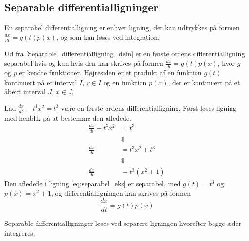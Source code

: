 \subsection{Separable differentialligninger}
En separabel differentialligning er enhver ligning, der kan udtrykkes på formen $\frac{dx}{dt}=g(t)p(x)$, og som kan løses ved integration.


Ud fra \autoref{Separable_differentialligning_defn} er en første ordens differentialligning separabel hvis og kun hvis den kan skrives på formen $\frac{dx}{dt}=g(t)p(x)$, hvor $g$ og $p$ er kendte funktioner. Højresiden er et produkt af en funktion $g(t)$ kontinuert på et interval $I$, $y\in I$ og en funktion $p(x)$, der er kontinuert på et åbent interval $J$, $x\in J$.

\begin{eks} \textbf{} %
\newline
Lad $\frac{dx}{dt}-t^3x^2=t^3$ være en første ordens differentialligning.
Først løses ligning med henblik på at bestemme den afledede.
\begin{align}
    \frac{dx}{dt}-t^3x^2&=t^3\nonumber\\
    &\Updownarrow\nonumber\\
    \frac{dx}{dt}&=t^3x^2+t^3\nonumber\\
    &\Updownarrow\nonumber\\
    \frac{dx}{dt}&=t^3(x^2+1) \label{eq:separabel_eks}
\end{align}
Den afledede i ligning \eqref{eq:separabel_eks} er separabel, med $g(t)=t^3$ og $p(x)=x^2+1$, og differentialligningen kan skrives på formen
    $$\frac{dx}{dt}=g(t)p(x)$$
\end{eks} 

Separable differentialligninger løses ved separere ligningen hvorefter begge sider integreres. 